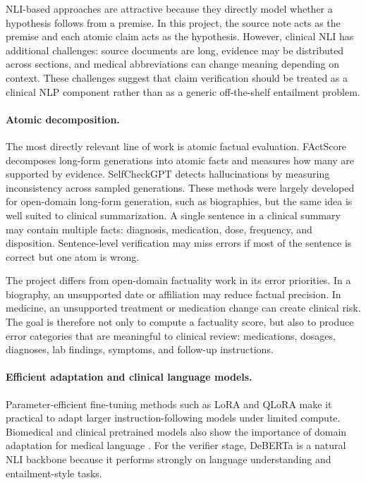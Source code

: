\documentclass[11pt]{article}
\begin{document}
NLI-based approaches are attractive because they directly model whether a hypothesis follows from a premise. In this project, the source note acts as the premise and each atomic claim acts as the hypothesis. However, clinical NLI has additional challenges: source documents are long, evidence may be distributed across sections, and medical abbreviations can change meaning depending on context. These challenges suggest that claim verification should be treated as a clinical NLP component rather than as a generic off-the-shelf entailment problem.

\paragraph{Atomic decomposition.}
The most directly relevant line of work is atomic factual evaluation. FActScore \cite{min2023factscore} decomposes long-form generations into atomic facts and measures how many are supported by evidence. SelfCheckGPT \cite{manakul2023selfcheckgpt} detects hallucinations by measuring inconsistency across sampled generations. These methods were largely developed for open-domain long-form generation, such as biographies, but the same idea is well suited to clinical summarization. A single sentence in a clinical summary may contain multiple facts: diagnosis, medication, dose, frequency, and disposition. Sentence-level verification may miss errors if most of the sentence is correct but one atom is wrong.

The project differs from open-domain factuality work in its error priorities. In a biography, an unsupported date or affiliation may reduce factual precision. In medicine, an unsupported treatment or medication change can create clinical risk. The goal is therefore not only to compute a factuality score, but also to produce error categories that are meaningful to clinical review: medications, dosages, diagnoses, lab findings, symptoms, and follow-up instructions.

\paragraph{Efficient adaptation and clinical language models.}
Parameter-efficient fine-tuning methods such as LoRA \cite{hu2022lora} and QLoRA \cite{dettmers2023qlora} make it practical to adapt larger instruction-following models under limited compute. Biomedical and clinical pretrained models also show the importance of domain adaptation for medical language \cite{alsentzer2019publicly, gu2021domain}. For the verifier stage, DeBERTa \cite{he2021deberta} is a natural NLI backbone because it performs strongly on language understanding and entailment-style tasks.
\end{document}
